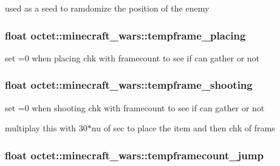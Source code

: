 used as a seed to ramdomize the position of the enemy 

\hypertarget{classoctet_1_1minecraft__wars_a702c765ff3b72d26326f0c23dafee7b5}{
\subsubsection[{tempframe\+\_\+placing}]{\setlength{\rightskip}{0pt plus 5cm}float octet\+::minecraft\+\_\+wars\+::tempframe\+\_\+placing\hspace{0.3cm}{\ttfamily [private]}}}\label{classoctet_1_1minecraft__wars_a702c765ff3b72d26326f0c23dafee7b5}


set =0 when placing chk with framecount to see if can gather or not 

\hypertarget{classoctet_1_1minecraft__wars_ac0f39aace1058f32df099906feed5f72}{
\subsubsection[{tempframe\+\_\+shooting}]{\setlength{\rightskip}{0pt plus 5cm}float octet\+::minecraft\+\_\+wars\+::tempframe\+\_\+shooting\hspace{0.3cm}{\ttfamily [private]}}}\label{classoctet_1_1minecraft__wars_ac0f39aace1058f32df099906feed5f72}


set =0 when shooting chk with framecount to see if can gather or not 

multiplay this with 30$\ast$nu of sec to place the item and then chk of frams \hypertarget{classoctet_1_1minecraft__wars_aa931e9fbabfd6f4e34be1d347c0f3243}{
\subsubsection[{tempframecount\+\_\+jump}]{\setlength{\rightskip}{0pt plus 5cm}float octet\+::minecraft\+\_\+wars\+::tempframecount\+\_\+jump\hspace{0.3cm}{\ttfamily [private]}}}\label{classoctet_1_1minecraft__wars_aa931e9fbabfd6f4e34be1d347c0f3243}


